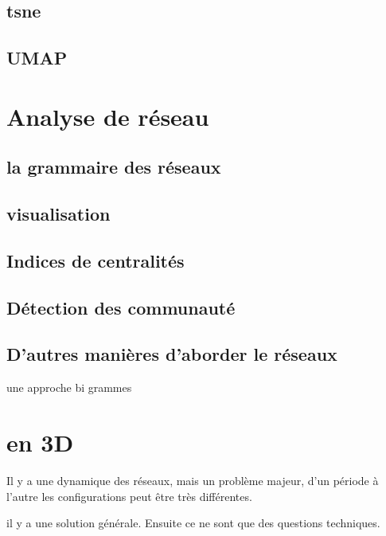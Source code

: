 \documentclass[
  letterpaper,
  DIV=11,
  numbers=noendperiod]{scrreprt}
\begin{document}
\subsection{tsne}\label{tsne}

\subsection{UMAP}\label{umap}

\section{Analyse de réseau}\label{analyse-de-ruxe9seau}

\subsection{la grammaire des réseaux}\label{la-grammaire-des-ruxe9seaux}

\subsection{visualisation}\label{visualisation}

\subsection{Indices de centralités}\label{indices-de-centralituxe9s}

\subsection{Détection des
communauté}\label{duxe9tection-des-communautuxe9}

\subsection{D'autres manières d'aborder le
réseaux}\label{dautres-maniuxe8res-daborder-le-ruxe9seaux}

une approche bi grammes

\section{en 3D}\label{en-3d}

Il y a une dynamique des réseaux, mais un problème majeur, d'un période
à l'autre les configurations peut être très différentes.

il y a une solution générale. Ensuite ce ne sont que des questions
techniques.
\end{document}
